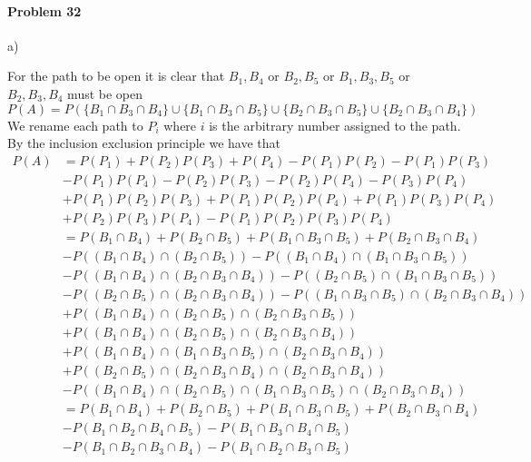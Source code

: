 \paragraph{Problem 32}

a)

For the path to be open it is clear that $B_1,B_4$ or $B_2,B_5$ or $B_1,B_3,B_5$ or $B_2,B_3,B_4$ must be open
\[
    P(A)=P(\{B_1\cap B_3\cap B_4\}\cup\{B_1\cap B_3\cap B_5\}\cup\{B_2\cap B_3\cap B_5\}\cup\{B_2\cap B_3\cap B_4\})
\]
We rename each path to $P_i$ where $i$ is the arbitrary number assigned to the path. By the inclusion exclusion principle we have that
\begin{align*}
    P(A)&=P(P_1)+P(P_2)P(P_3)+P(P_4)-P(P_1)P(P_2)-P(P_1)P(P_3) \\
        &-P(P_1)P(P_4)-P(P_2)P(P_3)-P(P_2)P(P_4)-P(P_3)P(P_4) \\
        &+P(P_1)P(P_2)P(P_3)+P(P_1)P(P_2)P(P_4)+P(P_1)P(P_3)P(P_4) \\
        &+P(P_2)P(P_3)P(P_4)-P(P_1)P(P_2)P(P_3)P(P_4) \\
        &=P(B_1\cap B_4)+P(B_2\cap B_5)+P(B_1\cap B_3\cap B_5)+P(B_2\cap B_3\cap B_4) \\
        &-P((B_1\cap B_4)\cap(B_2\cap B_5))-P((B_1\cap B_4)\cap(B_1\cap B_3\cap B_5)) \\
        &-P((B_1\cap B_4)\cap(B_2\cap B_3\cap B_4))-P((B_2\cap B_5)\cap(B_1\cap B_3\cap B_5)) \\
        &-P((B_2\cap B_5)\cap(B_2\cap B_3\cap B_4))-P((B_1\cap B_3\cap B_5)\cap(B_2\cap B_3\cap B_4)) \\
        &+P((B_1\cap B_4)\cap(B_2\cap B_5)\cap(B_2\cap B_3\cap B_5)) \\
        &+P((B_1\cap B_4)\cap(B_2\cap B_5)\cap(B_2\cap B_3\cap B_4)) \\
        &+P((B_1\cap B_4)\cap(B_1\cap B_3\cap B_5)\cap(B_2\cap B_3\cap B_4)) \\
        &+P((B_2\cap B_5)\cap(B_2\cap B_3\cap B_4)\cap(B_2\cap B_3\cap B_4)) \\
        &-P((B_1\cap B_4)\cap(B_2\cap B_5)\cap(B_1\cap B_3\cap B_5)\cap(B_2\cap B_3\cap B_4)) \\
        &=P(B_1\cap B_4)+P(B_2\cap B_5)+P(B_1\cap B_3\cap B_5)+P(B_2\cap B_3\cap B_4) \\
        &-P(B_1\cap B_2\cap B_4\cap B_5)-P(B_1\cap B_3\cap B_4\cap B_5) \\
        &-P(B_1\cap B_2\cap B_3\cap B_4)-P(B_1\cap B_2\cap B_3\cap B_5) \\

\end{align*}
